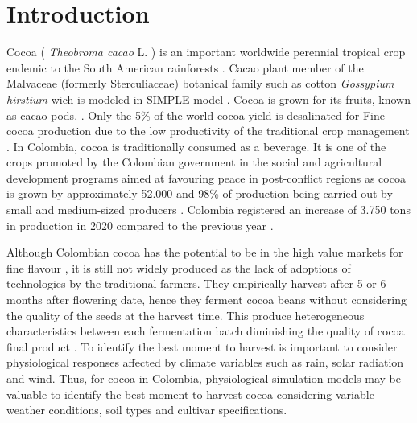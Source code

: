 \documentclass[gene,journal,article,submit,moreauthors,pdftex]{Definitions/mdpi}
\begin{document}

\section{Introduction}

Cocoa ( \textit{Theobroma cacao }L. ) is an important worldwide perennial tropical crop endemic to the South American rainforests \citep{zuidema2005, motamayor2002, argout2011, Rodriguez2019}. Cacao plant member of the Malvaceae (formerly Sterculiaceae)  botanical family such as  cotton \textit{ Gossypium hirstium} \citep{Nix2017cotton} wich is modeled in SIMPLE model \citep{Zao2019simple}. Cocoa is grown for its fruits, known as cacao pods.  \citep{ Niemenak2010, suarez2021}. Only the 5\% of the world cocoa yield is desalinated for Fine-cocoa production due to the low productivity of  the traditional crop management \citep{argout2011}.  In Colombia, cocoa  is  traditionally  consumed  as  a  beverage. It is one of the crops promoted by the Colombian government in the social and agricultural development  programs aimed at favouring peace in post-conflict regions \citep{Rodriguez2019, Abbott2019} as cocoa is grown by approximately 52.000 \citep{Gutierrez2020} and 98\% of production being carried out by small and medium-sized producers \citep{Garcia2014, Escobar2020}. Colombia registered an increase of 3.750 tons in production in 2020 compared to the previous year \citep{lamos2020}. 

Although Colombian cocoa has the potential to be in the high value markets for fine flavour \citep{Escobar2020}, it is still not widely produced as the lack of adoptions of technologies by the traditional farmers. They empirically harvest after 5 or 6 months after flowering date, hence they ferment cocoa beans without considering the  quality of the seeds at the harvest time. This produce heterogeneous characteristics between each fermentation batch diminishing the quality of cocoa final product \citep{Escobar2021}. To identify the best moment to harvest is important to consider physiological responses affected by climate variables such as rain, solar radiation and wind.  Thus,  for cocoa in Colombia, physiological simulation models may be valuable to identify the best moment to harvest cocoa considering variable weather conditions, soil types and cultivar specifications. 
\end{document}
